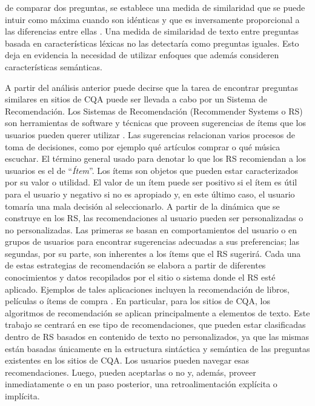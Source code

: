 de comparar dos preguntas, se establece una medida de similaridad que se puede intuir como máxima cuando son idénticas y que es inversamente proporcional a las diferencias entre ellas \citep{lin1998information}. Una medida de similaridad de texto entre preguntas basada en características léxicas no las detectaría como preguntas iguales. Esto deja en evidencia la necesidad de utilizar enfoques que además consideren características semánticas.

\bigskip A partir del análisis anterior puede decirse que la tarea de encontrar preguntas similares en sitios de CQA puede ser llevada a cabo por un Sistema de Recomendación. Los Sistemas de Recomendación (Recommender Systems o RS) son herramientas de software y técnicas que proveen sugerencias de ítems que los usuarios pueden querer utilizar \citep{ricci2011introduction}. Las sugerencias relacionan varios procesos de toma de decisiones, como por ejemplo qué artículos comprar o qué música escuchar. El término general usado para denotar lo que los RS recomiendan a los usuarios es el de “\textit{Ítem}”. Los ítems son objetos que pueden estar caracterizados por su valor o utilidad. El valor de un ítem puede ser positivo si el ítem es útil para el usuario y negativo si no es apropiado y, en este último caso, el usuario tomaría una mala decisión al seleccionarlo. A partir de la dinámica que se construye en los RS, las recomendaciones al usuario pueden ser personalizadas o no personalizadas. Las primeras se basan en comportamientos del usuario o en grupos de usuarios para encontrar sugerencias adecuadas a sus preferencias; las segundas, por su parte, son inherentes a los ítems que el RS sugerirá. Cada una de estas estrategias de recomendación se elabora a partir de diferentes conocimientos y datos recopilados por el sitio o sistema donde el RS esté aplicado. Ejemplos de tales aplicaciones incluyen la recomendación de libros, películas o ítems de compra \citep{adomavicius2005toward}. En particular, para los sitios de CQA, los algoritmos de recomendación se aplican principalmente a elementos de texto. Este trabajo se centrará en ese tipo de recomendaciones, que pueden estar clasificadas dentro de RS basados en contenido de texto no personalizados, ya que las mismas están basadas únicamente en la estructura sintáctica y semántica de las preguntas existentes en los sitios de CQA. Los usuarios pueden navegar esas recomendaciones. Luego, pueden aceptarlas o no y, además, proveer inmediatamente o en un paso posterior, una retroalimentación explícita o implícita.

